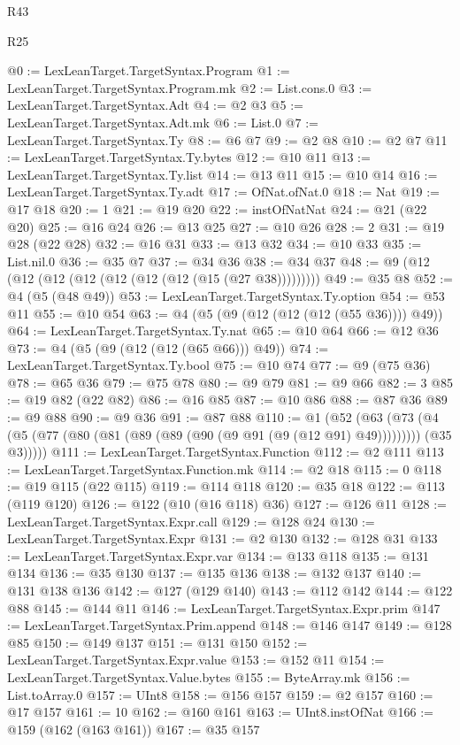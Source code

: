 \begin{lexlean}{R43}
\begin{lexlean}{R25}
\begin{coremodule}
{{{{{{{{{{{{{{{{{{{{{{{{{{{{{{{{{{{{{{{{{{{{{{{{{{{{{{{{{{{{{{{{{{{{{{{{{{{{{{{{{{{{{{{{{{{{{{{{{{{{{{{{{{{{{{{{{{{{{{{{{{{{{{{{{{{{{{{{{{{{{{{{{{{{{{{{{{{{{{{{{{{{{{{{{{{{{{{{{{{{{{{{{{{{{{{{{@0 := LexLeanTarget.TargetSyntax.Program
@1 := LexLeanTarget.TargetSyntax.Program.mk
@2 := List.cons.{0}
@3 := LexLeanTarget.TargetSyntax.Adt
@4 := @2 @3
@5 := LexLeanTarget.TargetSyntax.Adt.mk
@6 := List.{0}
@7 := LexLeanTarget.TargetSyntax.Ty
@8 := @6 @7
@9 := @2 @8
@10 := @2 @7
@11 := LexLeanTarget.TargetSyntax.Ty.bytes
@12 := @10 @11
@13 := LexLeanTarget.TargetSyntax.Ty.list
@14 := @13 @11
@15 := @10 @14
@16 := LexLeanTarget.TargetSyntax.Ty.adt
@17 := OfNat.ofNat.{0}
@18 := Nat
@19 := @17 @18
@20 := 1
@21 := @19 @20
@22 := instOfNatNat
@24 := @21 (@22 @20)
@25 := @16 @24
@26 := @13 @25
@27 := @10 @26
@28 := 2
@31 := @19 @28 (@22 @28)
@32 := @16 @31
@33 := @13 @32
@34 := @10 @33
@35 := List.nil.{0}
@36 := @35 @7
@37 := @34 @36
@38 := @34 @37
@48 := @9 (@12 (@12 (@12 (@12 (@12 (@12 (@12 (@15 (@27 @38)))))))))
@49 := @35 @8
@52 := @4 (@5 (@48 @49))
@53 := LexLeanTarget.TargetSyntax.Ty.option
@54 := @53 @11
@55 := @10 @54
@63 := @4 (@5 (@9 (@12 (@12 (@12 (@55 @36)))) @49))
@64 := LexLeanTarget.TargetSyntax.Ty.nat
@65 := @10 @64
@66 := @12 @36
@73 := @4 (@5 (@9 (@12 (@12 (@65 @66))) @49))
@74 := LexLeanTarget.TargetSyntax.Ty.bool
@75 := @10 @74
@77 := @9 (@75 @36)
@78 := @65 @36
@79 := @75 @78
@80 := @9 @79
@81 := @9 @66
@82 := 3
@85 := @19 @82 (@22 @82)
@86 := @16 @85
@87 := @10 @86
@88 := @87 @36
@89 := @9 @88
@90 := @9 @36
@91 := @87 @88
@110 := @1
    (@52
      (@63
        (@73 (@4 (@5 (@77 (@80 (@81 (@89 (@89 (@90 (@9 @91 (@9 (@12 @91) @49))))))))) (@35 @3)))))
@111 := LexLeanTarget.TargetSyntax.Function
@112 := @2 @111
@113 := LexLeanTarget.TargetSyntax.Function.mk
@114 := @2 @18
@115 := 0
@118 := @19 @115 (@22 @115)
@119 := @114 @118
@120 := @35 @18
@122 := @113 (@119 @120)
@126 := @122 (@10 (@16 @118) @36)
@127 := @126 @11
@128 := LexLeanTarget.TargetSyntax.Expr.call
@129 := @128 @24
@130 := LexLeanTarget.TargetSyntax.Expr
@131 := @2 @130
@132 := @128 @31
@133 := LexLeanTarget.TargetSyntax.Expr.var
@134 := @133 @118
@135 := @131 @134
@136 := @35 @130
@137 := @135 @136
@138 := @132 @137
@140 := @131 @138 @136
@142 := @127 (@129 @140)
@143 := @112 @142
@144 := @122 @88
@145 := @144 @11
@146 := LexLeanTarget.TargetSyntax.Expr.prim
@147 := LexLeanTarget.TargetSyntax.Prim.append
@148 := @146 @147
@149 := @128 @85
@150 := @149 @137
@151 := @131 @150
@152 := LexLeanTarget.TargetSyntax.Expr.value
@153 := @152 @11
@154 := LexLeanTarget.TargetSyntax.Value.bytes
@155 := ByteArray.mk
@156 := List.toArray.{0}
@157 := UInt8
@158 := @156 @157
@159 := @2 @157
@160 := @17 @157
@161 := 10
@162 := @160 @161
@163 := UInt8.instOfNat
@166 := @159 (@162 (@163 @161))
@167 := @35 @157
}}}}}}}}}}}}}}}}}}}}}}}}}}}}}}}}}}}}}}}}}}}}}}}}}}}}}}}}}}}}}}}}}}}}}}}}}}}}}}}}}}}}}}}}}}}}}}}}}}}}}}}}}}}}}}}}}}}}}}}}}}}}}}}}}}}}}}}}}}}}}}}}}}}}}}}}}}}}}}}}}}}}}}}}}}}}}}}}}}}}}}}}}}}}}}}}}
\end{coremodule}
\end{lexlean}
\end{lexlean}

